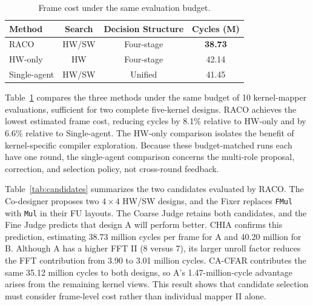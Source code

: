 \documentclass[conference,letterpaper]{IEEEtran}
\begin{document}

\begin{table}[t]
\centering
\small
\begin{tabular*}{\columnwidth}
{@{\extracolsep{\fill}}lccc@{}}
\toprule
Method & Search & Decision Structure & Cycles (M) \tabularnewline
\midrule
RACO & HW/SW & Four-stage & \textbf{38.73} \tabularnewline
HW-only & HW & Four-stage & 42.14 \tabularnewline
Single-agent & HW/SW & Unified & 41.45 \tabularnewline
\bottomrule
\end{tabular*}
\caption{Frame cost under the same evaluation budget.}
\label{tab:overall}
\end{table}

Table~\ref{tab:overall} compares the three methods under the same budget of 10 kernel-mapper evaluations, sufficient for two complete five-kernel designs. RACO achieves the lowest estimated frame cost, reducing cycles by 8.1\% relative to HW-only and by 6.6\% relative to Single-agent. The HW-only comparison isolates the benefit of kernel-specific compiler exploration. Because these budget-matched runs each have one round, the single-agent comparison concerns the multi-role proposal, correction, and selection policy, not cross-round feedback.

Table~\ref{tab:candidates} summarizes the two candidates evaluated by RACO. The Co-designer proposes two \(4\times4\) HW/SW designs, and the Fixer replaces \texttt{FMul} with \texttt{Mul} in their FU layouts. The Coarse Judge retains both candidates, and the Fine Judge predicts that design A will perform better. CHIA confirms this prediction, estimating 38.73 million cycles per frame for A and 40.20 million for B. Although A has a higher FFT II (8 versus 7), its larger unroll factor reduces the FFT contribution from 3.90 to 3.01 million cycles. CA-CFAR contributes the same 35.12 million cycles to both designs, so A's 1.47-million-cycle advantage arises from the remaining kernel views. This result shows that candidate selection must consider frame-level cost rather than individual mapper II alone.
\end{document}
